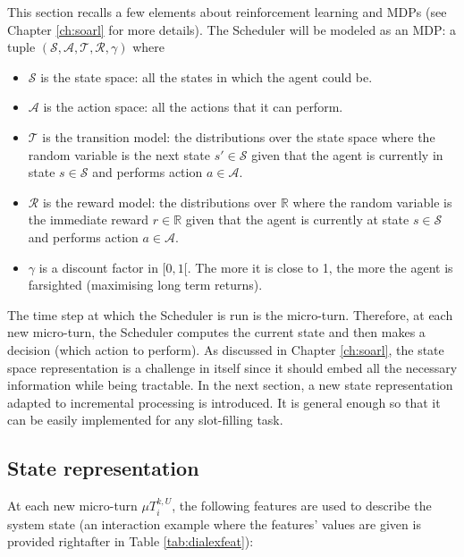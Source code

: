              This section recalls a few elements about reinforcement learning and MDPs (see Chapter \ref{ch:soarl} for more details). The Scheduler will be modeled as an MDP: a tuple $(\mathcal{S},\mathcal{A},\mathscr{T},\mathscr{R},\gamma)$ where

             \begin{itemize}
                \item $\mathcal{S}$ is the state space: all the states in which the agent could be.
                \item $\mathcal{A}$ is the action space: all the actions that it can perform.
                \item $\mathscr{T}$ is the transition model: the distributions over the state space where the random variable is the next state $s' \in \mathcal{S}$ given that the agent is currently in state $s \in \mathcal{S}$ and performs action $a \in \mathcal{A}$.
                \item $\mathscr{R}$ is the reward model: the distributions over $\mathbb{R}$ where the random variable is the immediate reward $r \in \mathbb{R}$ given that the agent is currently at state $s \in \mathcal{S}$ and performs action $a \in \mathcal{A}$.
                \item $\gamma$ is a discount factor in $[0,1[$. The more it is close to 1, the more the agent is farsighted (maximising long term returns).
             \end{itemize}

             The time step at which the Scheduler is run is the micro-turn. Therefore, at each new micro-turn, the Scheduler computes the current state and then makes a decision (which action to perform). As discussed in Chapter \ref{ch:soarl}, the state space representation is a challenge in itself since it should embed all the necessary information while being tractable. In the next section, a new state representation adapted to incremental processing is introduced. It is general enough so that it can be easily implemented for any slot-filling task.

	\subsection{State representation}
    
    	At each new micro-turn $\mu T^{k,U}_i$, the following features are used to describe the system state (an interaction example where the features' values are given is provided rightafter in Table \ref{tab:dialexfeat}):
        
